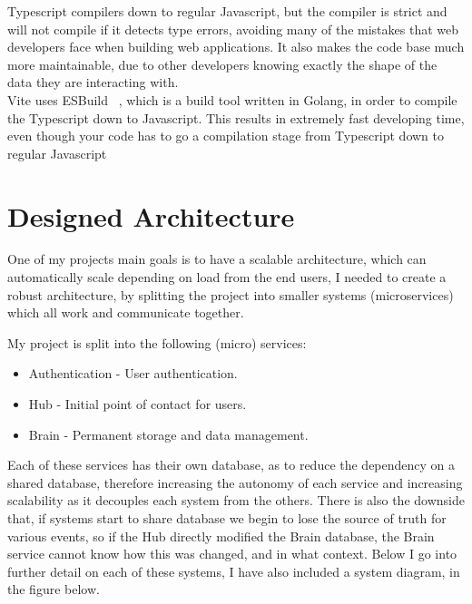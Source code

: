\documentclass[titlepage]{article}
\begin{document}
Typescript compilers down to regular Javascript, but the compiler is strict and will not compile if it detects type errors, avoiding many of the mistakes that web developers face when building web applications. It also makes the code base much more maintainable, due to other developers knowing exactly the shape of the data they are interacting with. \\

Vite uses ESBuild ~\cite{esbuild}, which is a build tool written in Golang, in order to compile the Typescript down to Javascript. This results in extremely fast developing time, even though your code has to go a compilation stage from Typescript down to regular Javascript \\

\section{Designed Architecture}
One of my projects main goals is to have a scalable architecture, which can automatically scale depending on load from the end users, I needed to create a robust architecture, by splitting the project into smaller systems (microservices) which all work and communicate together.

My project is split into the following (micro) services:
\begin{itemize}
  \item Authentication - User authentication.
  \item Hub - Initial point of contact for users.
  \item Brain - Permanent storage and data management.
\end{itemize}

Each of these services has their own database, as to reduce the dependency on a shared database, therefore increasing the autonomy of each service and increasing scalability as it decouples each system from the others. There is also the downside that, if systems start to share database we begin to lose the source of truth for various events, so if the Hub directly modified the Brain database, the Brain service cannot know how this was changed, and in what context. Below I go into further detail on each of these systems, I have also included a system diagram, in the figure below.
\end{document}

